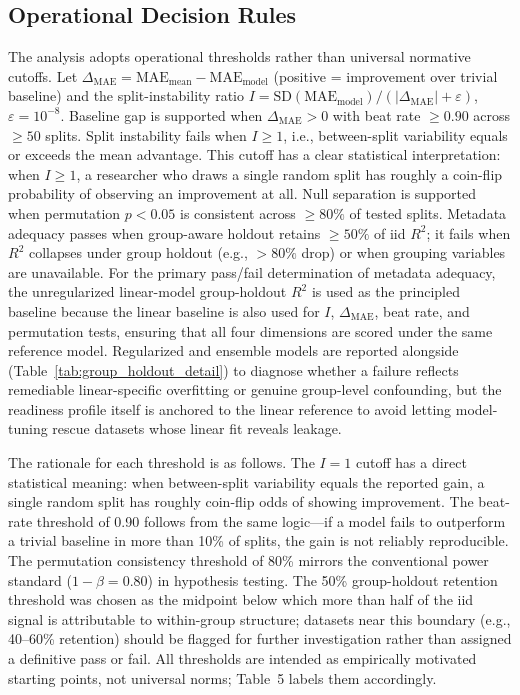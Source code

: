 \subsection{Operational Decision Rules}
The analysis adopts operational thresholds rather than universal normative cutoffs. Let $\Delta_{\mathrm{MAE}} = \mathrm{MAE}_{\text{mean}} - \mathrm{MAE}_{\text{model}}$ (positive = improvement over trivial baseline) and the split-instability ratio $I = \mathrm{SD}(\mathrm{MAE}_{\text{model}}) / (|\Delta_{\mathrm{MAE}}| + \varepsilon)$, $\varepsilon = 10^{-8}$. Baseline gap is supported when $\Delta_{\mathrm{MAE}} > 0$ with beat rate $\geq 0.90$ across $\geq 50$ splits. Split instability fails when $I \geq 1$, i.e., between-split variability equals or exceeds the mean advantage. This cutoff has a clear statistical interpretation: when $I \geq 1$, a researcher who draws a single random split has roughly a coin-flip probability of observing an improvement at all. Null separation is supported when permutation $p < 0.05$ is consistent across $\geq 80\%$ of tested splits. Metadata adequacy passes when group-aware holdout retains $\geq 50\%$ of iid $R^2$; it fails when $R^2$ collapses under group holdout (e.g., $> 80\%$ drop) or when grouping variables are unavailable. For the primary pass/fail determination of metadata adequacy, the unregularized linear-model group-holdout $R^2$ is used as the principled baseline because the linear baseline is also used for $I$, $\Delta_{\mathrm{MAE}}$, beat rate, and permutation tests, ensuring that all four dimensions are scored under the same reference model. Regularized and ensemble models are reported alongside (Table~\ref{tab:group_holdout_detail}) to diagnose whether a failure reflects remediable linear-specific overfitting or genuine group-level confounding, but the readiness profile itself is anchored to the linear reference to avoid letting model-tuning rescue datasets whose linear fit reveals leakage.

The rationale for each threshold is as follows. The $I = 1$ cutoff has a direct statistical meaning: when between-split variability equals the reported gain, a single random split has roughly coin-flip odds of showing improvement. The beat-rate threshold of 0.90 follows from the same logic---if a model fails to outperform a trivial baseline in more than 10\% of splits, the gain is not reliably reproducible. The permutation consistency threshold of 80\% mirrors the conventional power standard ($1 - \beta = 0.80$) in hypothesis testing. The 50\% group-holdout retention threshold was chosen as the midpoint below which more than half of the iid signal is attributable to within-group structure; datasets near this boundary (e.g., 40--60\% retention) should be flagged for further investigation rather than assigned a definitive pass or fail. All thresholds are intended as empirically motivated starting points, not universal norms; Table~5 labels them accordingly.

